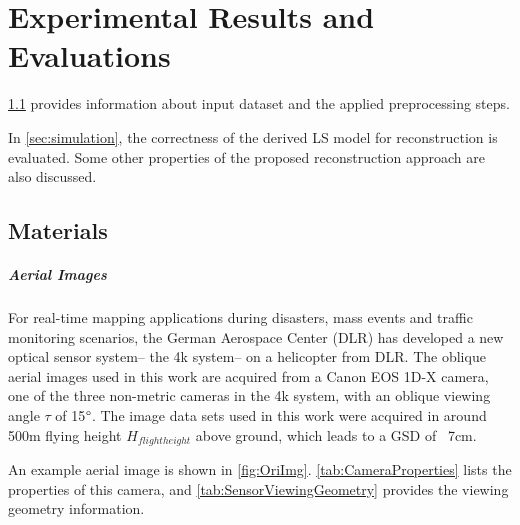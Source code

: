 \chapter{Experimental Results and Evaluations}
\label{chap:k3}

\cref{sec:Materials} provides information about input dataset and the applied preprocessing steps. 

In \cref{sec:simulation}, the correctness of the derived LS model for reconstruction is evaluated. Some other properties of the proposed reconstruction approach are also discussed.




\section{Materials}
\label{sec:Materials}

\paragraph{Aerial Images}
For real-time mapping applications during disasters, mass events and traffic monitoring scenarios, the German Aerospace Center (DLR) has developed a new optical sensor system-- the 4k system-- on a helicopter from DLR. The oblique aerial images used in this work are acquired from a Canon EOS 1D-X camera, one of the three non-metric cameras in the 4k system, with an oblique viewing angle $\tau$ of 15$\degree$. The image data sets used in this work were acquired in around 500m flying height $H_{flight height}$ above ground, which leads to a GSD of ~7cm. %

An example aerial image is shown in \cref{fig:OriImg}. \cref{tab:CameraProperties} lists the properties of this camera, and \cref{tab:SensorViewingGeometry} provides the viewing geometry information.


